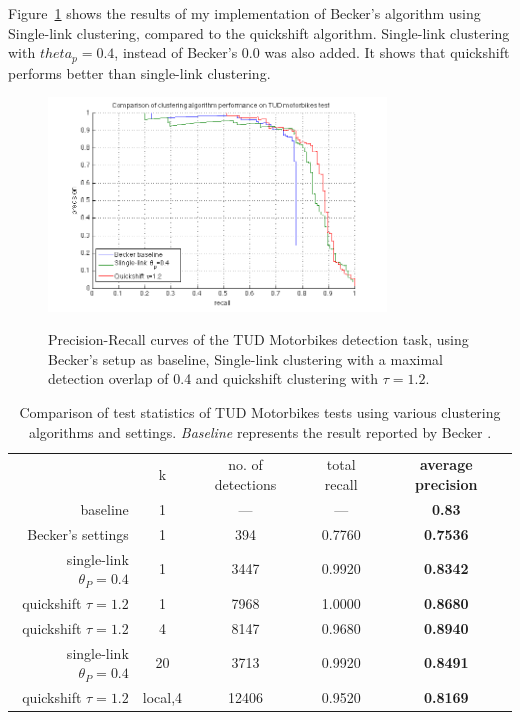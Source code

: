 Figure~\ref{fig:tudk1clusteralgos} shows the results of my implementation of Becker's algorithm using Single-link clustering, compared to the quickshift algorithm. Single-link clustering with $theta_p = 0.4$, instead of Becker's $0.0$ was also added. It shows that quickshift performs better than single-link clustering.

\begin{figure}[hbt]
    \centering
    \includegraphics[width=0.8\textwidth]{TUD_k1_clusteralgs}
    \label{fig:tudk1clusteralgos}
    \caption{Precision-Recall curves of the TUD Motorbikes detection task, using Becker's \cite{becker2012codebook} setup as baseline, Single-link clustering with a maximal detection overlap of 0.4 and quickshift clustering with $\tau = 1.2$.}
\end{figure}

\begin{table}
    \begin{tabular}{rc|cc>{\bfseries}c}
        ~&k&no. of detections&total recall&average precision \\
        baseline & 1 & --- & --- & 0.83 \\
        Becker's settings & 1 & 394 & 0.7760 & 0.7536\\
        single-link $\theta_P=0.4$ & 1 & 3447 & 0.9920 & 0.8342\\
        quickshift $\tau=1.2$ & 1 & 7968 & 1.0000 & 0.8680\\
        quickshift $\tau=1.2$ & 4 & 8147 & 0.9680 & 0.8940\\
        single-link $\theta_P=0.4$ & 20 & 3713 & 0.9920 & 0.8491\\
        quickshift $\tau=1.2$ & local,4 & 12406 & 0.9520 & 0.8169
    \end{tabular}
    \label{tab:tudk1clusteralgos}
    \caption{Comparison of test statistics of TUD Motorbikes tests using various clustering algorithms and settings. \emph{Baseline} represents the result reported by Becker \cite{becker2012codebook}.}
\end{table}

